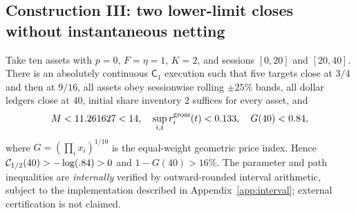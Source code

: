 \documentclass[review,hidelinks,onefignum,onetabnum]{siamonline250211}%
\begin{document}
\subsection{Construction III: two lower-limit closes without instantaneous netting}
\label{sec:conIII}
\begin{theorem}\label{thm:two}
Take ten assets with $p=0$, $F=\eta=1$, $K=2$, and sessions
$[0,20]$ and $[20,40]$. There is an absolutely continuous
$\mathsf C_1$ execution such that five targets close at $3/4$
and then at $9/16$, all assets obey sessionwise rolling
$\pm25\%$ bands, all dollar ledgers close at $40$, initial
share inventory $2$ suffices for every asset, and
\begin{equation}\label{eq:certresult}
 M<11.261627<14,\quad \sup_{i,t}r_i^{\rm gross}(t)<0.133,
 \quad G(40)<0.84,
\end{equation}
where $G=(\prod_i x_i)^{1/10}$ is the equal-weight geometric
price index. Hence $\mathcal{C}_{1/2}(40)>-\log(.84)>0$ and
$1-G(40)>16\%$.
The parameter and path inequalities are \emph{internally}
verified by outward-rounded interval arithmetic, subject to the
implementation described in Appendix~\ref{app:interval};
external certification is not claimed.
\end{theorem}
\end{document}
